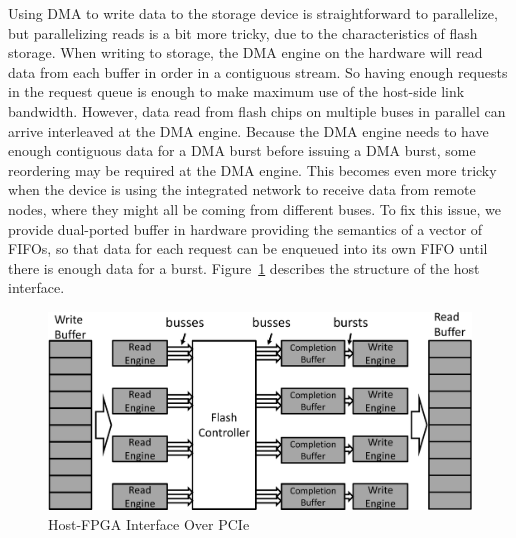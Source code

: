 Using DMA to write data to the storage device is straightforward to parallelize,
but parallelizing reads is a bit more tricky, due to the characteristics of flash
storage. When writing to storage, the DMA engine on the hardware will read data
from each buffer in order in a contiguous stream. So having enough requests in
the request queue is enough to make maximum use of the host-side link bandwidth.
However, data read from flash chips on multiple buses in parallel can arrive
interleaved at the DMA engine. Because the DMA engine needs to have enough
contiguous data for a DMA burst before issuing a DMA burst, some reordering may
be required at the DMA engine. This becomes even more tricky when the device is
using the integrated network to receive data from remote nodes, where they might
all be coming from different buses. To fix this issue, we provide dual-ported
buffer in hardware providing the semantics of a vector of FIFOs, so that data
for each request can be enqueued into its own FIFO until there is enough data
for a burst.
Figure~\ref{fig:hostinterface} describes the structure of the host
interface.

\begin{figure}[ht!]
	\centering
	\includegraphics[width=0.4	\textwidth]{figures/hostinterface-crop.pdf}
	\caption{Host-FPGA Interface Over PCIe}
	\label{fig:hostinterface}
\end{figure}

